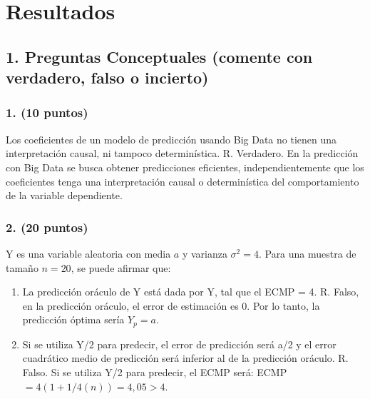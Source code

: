 \documentclass[twocolumn, 11pt, letterpaper]{article}
\begin{document}


\section*{Resultados}

\subsection*{1. Preguntas Conceptuales (comente con verdadero, falso o incierto)}

\subsubsection*{1. (10 puntos)} Los coeficientes de un modelo de predicción usando Big Data no tienen una interpretación causal, ni tampoco determinística.
R. Verdadero. En la predicción con Big Data se busca obtener predicciones eficientes, independientemente que los coeficientes tenga una interpretación causal o determinística del comportamiento de la variable dependiente.

\subsubsection*{2. (20 puntos)} Y es una variable aleatoria con media $a$ y varianza $\sigma^2 = 4$. Para una muestra de tamaño $n = 20$, se puede afirmar que:
\begin{enumerate}[label=\alph*)]
    \item La predicción oráculo de Y está dada por Y, tal que el ECMP = 4.
    R. Falso, en la predicción oráculo, el error de estimación es 0. Por lo tanto, la predicción óptima sería $Y_p = a$.
    \item Si se utiliza Y/2 para predecir, el error de predicción será a/2 y el error cuadrático medio de predicción será inferior al de la predicción oráculo.
    R. Falso. Si se utiliza Y/2 para predecir, el ECMP será: ECMP $= 4(1 + 1/4(n)) = 4,05 > 4$.
\end{enumerate}
\end{document}
